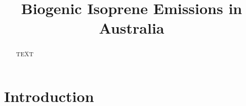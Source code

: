 \documentclass[acp, manuscript]{copernicus}
\begin{document}
\title{Biogenic Isoprene Emissions in Australia}












\received{}
\pubdiscuss{} %
\revised{}
\accepted{}
\published{}




\maketitle



\begin{abstract}
TEXT
\end{abstract}





\section{Introduction}  
\label{BioIsop:intro}  
\end{document}
